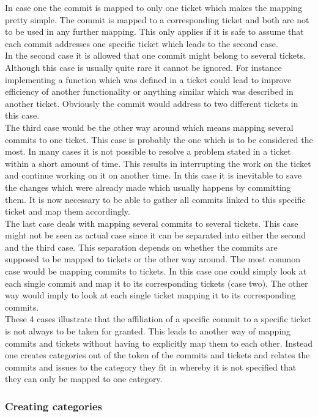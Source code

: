 In case one the commit is mapped to only one ticket which makes the mapping pretty simple.
The commit is mapped to a corresponding ticket and both are not to be used in any further mapping.
This only applies if it is safe to assume that each commit addresses one specific ticket which leads to the second case.\\
In the second case it is allowed that one commit might belong to several tickets.
Although this case is usually quite rare it cannot be ignored.
For instance implementing a function which was defined in a ticket could lead to improve efficiency of another functionality or anything similar which was described in another ticket.
Obviously the commit would address to two different tickets in this case.\\
The third case would be the other way around which means mapping several commits to one ticket.
This case is probably the one which is to be considered the most.
In many cases it is not possible to resolve a problem stated in a ticket within a short amount of time.
This results in interrupting the work on the ticket and continue working on it on another time.
In this case it is inevitable to save the changes which were already made which usually happens by committing them.
It is now necessary to be able to gather all commits linked to this specific ticket and map them accordingly.\\
The last case deals with mapping several commits to several tickets.
This case might not be seen as actual case since it can be separated into either the second and the third case.
This separation depends on whether the commits are supposed to be mapped to tickets or the other way around.
The most common case would be mapping commits to tickets.
In this case one could simply look at each single commit and map it to its corresponding tickets (case two).
The other way would imply to look at each single ticket mapping it to its corresponding commits.\\
These 4 cases illustrate that the affiliation of a specific commit to a specific ticket is not always to be taken for granted.
This leads to another way of mapping commits and tickets without having to explicitly map them to each other.
Instead one creates categories out of the token of the commits and tickets and relates the commits and issues to the category they fit in whereby it is not specified that they can only be mapped to one category.

\subsubsection{Creating categories}

